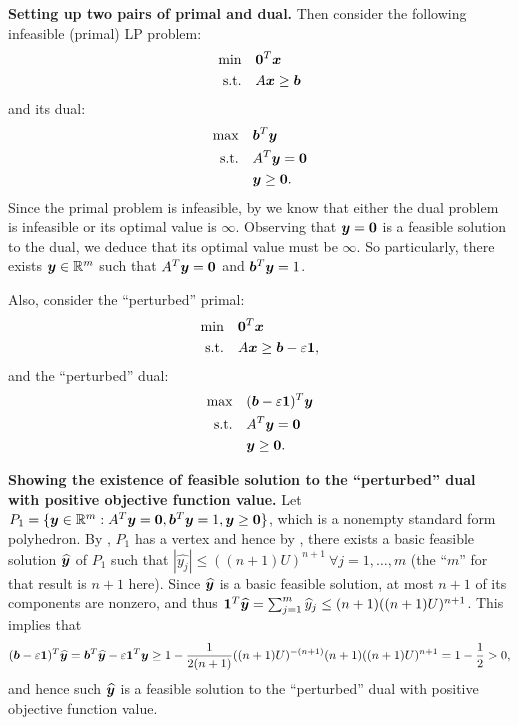 \begin{enumerate}
\begin{pf}
\begin{enumerate}
\textbf{Setting up two pairs of primal and dual.} Then consider the following infeasible
(primal) LP problem:
\begin{align*}
\text{min}\quad&\bm{0}^{T}\bm{x} \\
\text{s.t.}\quad&A\bm{x}\ge\bm{b}
\end{align*}
and its dual:
\begin{align*}
\text{max}\quad&\bm{b}^{T}\bm{y} \\
\text{s.t.}\quad&A^{T}\bm{y}=\bm{0} \\
&\bm{y}\ge\bm{0}.
\end{align*}
Since the primal problem is infeasible, by  we
know that either the dual problem is infeasible or its optimal value is \(\infty\).
Observing that \(\bm{y}=\bm{0}\) is a feasible solution to the dual, we
deduce that its optimal value must be \(\infty\). So particularly, there exists
\(\bm{y}\in\mathbb{R}^m\) such that \(A^{T}\bm{y}=\bm{0}\) and
\(\bm{b}^{T}\bm{y}=1\).

Also, consider the ``perturbed'' primal:
\begin{align*}
\text{min}\quad&\bm{0}^{T}\bm{x} \\
\text{s.t.}\quad&A\bm{x}\ge\bm{b}-\varepsilon\bm{1},
\end{align*}
and the ``perturbed'' dual:
\begin{align*}
\text{max}\quad&(\bm{b}-\varepsilon\bm{1})^{T}\bm{y} \\
\text{s.t.}\quad&A^{T}\bm{y}=\bm{0} \\
&\bm{y}\ge\bm{0}.
\end{align*}

\textbf{Showing the existence of feasible solution to the ``perturbed'' dual
with positive objective function value.}
Let \(P_1=\{\bm{y}\in\mathbb{R}^m:A^{T}\bm{y}=\bm{0},
\bm{b}^{T}\bm{y}=1, \bm{y}\ge\bm{0}\}\), which is a nonempty standard
form polyhedron.  By , \(P_1\) has a vertex and
hence by , there exists a basic feasible
solution \(\widehat{\bm{y}}\) of \(P_1\) such that \(|\widehat{y_j}|\le
((n+1)U)^{n+1}~\forall j=1,\dotsc,m\) (the ``\(m\)'' for that result is \(n+1\)
here). Since \(\widehat{\bm{y}}\) is a basic feasible solution, at most
\(n+1\) of its components are nonzero, and thus
\(\bm{1}^{T}\widehat{\bm{y}}=\sum_{j=1}^{m}\widehat{y}_j\le (n+1)((n+1)U)^{n+1}\).
This implies that
\[
(\bm{b}-\varepsilon\bm{1})^{T}\widehat{\bm{y}}
=\bm{b}^{T}\widehat{\bm{y}}-\varepsilon\bm{1}^{T}\bm{y}
\ge 1-\frac{1}{2(n+1)}((n+1)U)^{-(n+1)}(n+1)((n+1)U)^{n+1}
=1-\frac{1}{2}>0,
\]
and hence such \(\widehat{\bm{y}}\) is a feasible solution to the
``perturbed'' dual with positive objective function value.


\end{enumerate}
\end{pf}
\end{enumerate}
